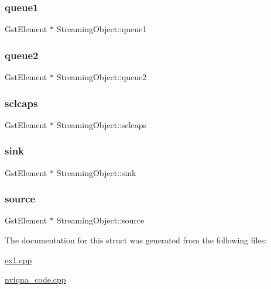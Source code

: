 \subsubsection{\texorpdfstring{queue1}{queue1}}
{\footnotesize\ttfamily Gst\+Element $\ast$ Streaming\+Object\+::queue1}

\mbox{\label{structStreamingObject_a0d0560f361ad580b3afb0981dfdb802b}} 
\subsubsection{\texorpdfstring{queue2}{queue2}}
{\footnotesize\ttfamily Gst\+Element $\ast$ Streaming\+Object\+::queue2}

\mbox{\label{structStreamingObject_af9a01fabb57334fd63930b1c22025eba}} 
\subsubsection{\texorpdfstring{sclcaps}{sclcaps}}
{\footnotesize\ttfamily Gst\+Element $\ast$ Streaming\+Object\+::sclcaps}

\mbox{\label{structStreamingObject_a6217252f54e2bedd935665290d01a20f}} 
\subsubsection{\texorpdfstring{sink}{sink}}
{\footnotesize\ttfamily Gst\+Element $\ast$ Streaming\+Object\+::sink}

\mbox{\label{structStreamingObject_a10849f982c00cb2f28f97b285efb899f}} 
\subsubsection{\texorpdfstring{source}{source}}
{\footnotesize\ttfamily Gst\+Element $\ast$ Streaming\+Object\+::source}



The documentation for this struct was generated from the following files\+:\begin{DoxyCompactItemize}
\item 
\mbox{\hyperlink{ex1_8cpp}{ex1.\+cpp}}\item 
\mbox{\hyperlink{nviqna__code_8cpp}{nviqna\+\_\+code.\+cpp}}\end{DoxyCompactItemize}
